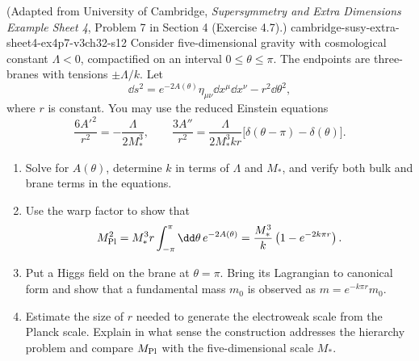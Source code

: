 \begin{enumerate}
    {(Adapted from University of Cambridge, \emph{Supersymmetry and Extra
      Dimensions Example Sheet 4}, Problem 7 in Section 4 (Exercise 4.7).)}
    {cambridge-susy-extra-sheet4-ex4p7-v3ch32-s12}
  Consider five-dimensional gravity with cosmological constant \(\Lambda<0\),
  compactified on an interval \(0\leq\theta\leq\pi\).  The endpoints are
  three-branes with tensions \(\pm\Lambda/k\).  Let
  \[
    \dd s^2=e^{-2A(\theta)}\eta_{\mu\nu}\dd x^\mu \dd x^\nu-r^2\dd\theta^2,
  \]
  where \(r\) is constant.  You may use the reduced Einstein equations
  \[
    \frac{6A'^2}{r^2}=-\frac{\Lambda}{2M_*^3},
    \qquad
    \frac{3A''}{r^2}=\frac{\Lambda}{2M_*^3kr}
      \bigl[\delta(\theta-\pi)-\delta(\theta)\bigr].
  \]
  \begin{enumerate}
    \item Solve for \(A(\theta)\), determine \(k\) in terms of \(\Lambda\)
      and \(M_*\), and verify both bulk and brane terms in the equations.
    \item Use the warp factor to show that
      \[
        M_{\rm Pl}^2=M_*^3r\int_{-\pi}^{\pi}\dd\theta\,e^{-2A(\theta)}
          =\frac{M_*^3}{k}\left(1-e^{-2k\pi r}\right).
      \]
    \item Put a Higgs field on the brane at \(\theta=\pi\).  Bring its
      Lagrangian to canonical form and show that a fundamental mass \(m_0\)
      is observed as \(m=e^{-k\pi r}m_0\).
    \item Estimate the size of \(r\) needed to generate the electroweak
      scale from the Planck scale.  Explain in what sense the construction
      addresses the hierarchy problem and compare \(M_{\rm Pl}\) with the
      five-dimensional scale \(M_*\).
  \end{enumerate}

\end{enumerate}
